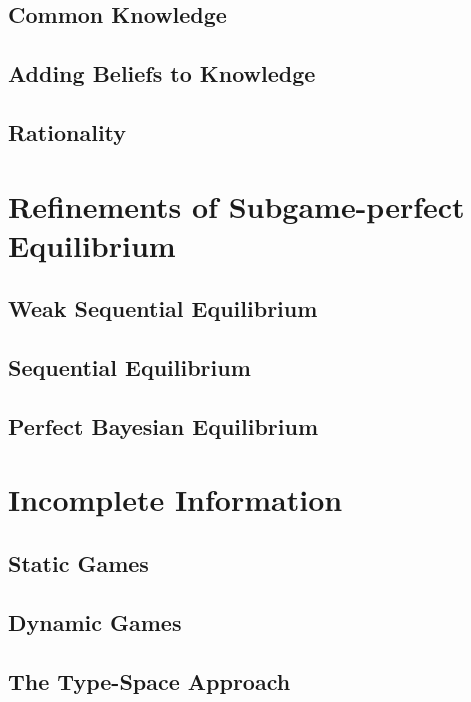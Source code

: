 		\section{Common Knowledge}

		\section{Adding Beliefs to Knowledge}

		\section{Rationality}

	\chapter{Refinements of Subgame-perfect Equilibrium}
		\section{Weak Sequential Equilibrium}

		\section{Sequential Equilibrium}

		\section{Perfect Bayesian Equilibrium}

	\chapter{Incomplete Information}
		\section{Static Games}

		\section{Dynamic Games}

		\section{The Type-Space Approach}
